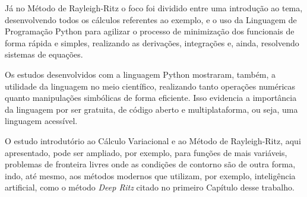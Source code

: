 \documentclass[
	12pt,				%
	openright,			%
    twoside,			%
	a4paper,			%
	english,			%
	french,				%
	spanish,			%
	brazil				%
	]{abntex2}
\numberwithin{lema}{chapter}
\numberwithin{teorema}{chapter}
\numberwithin{definicao}{chapter}
\numberwithin{exemplo}{chapter}
\numberwithin{figure}{chapter}
\begin{document}
Já no Método de Rayleigh-Ritz o foco foi dividido entre uma introdução ao tema, desenvolvendo todos os cálculos referentes ao exemplo, e o uso da Linguagem de Programação Python para agilizar o processo de minimização dos funcionais de forma rápida e simples, realizando as derivações, integrações e, ainda, resolvendo sistemas de equações.

Os estudos desenvolvidos com a linguagem Python mostraram, também, a utilidade da linguagem no meio científico, realizando tanto operações numéricas quanto manipulações simbólicas de forma eficiente. Isso evidencia a importância da linguagem por ser gratuita, de código aberto e multiplataforma, ou seja, uma linguagem acessível.

O estudo introdutório ao Cálculo Variacional e ao Método de Rayleigh-Ritz, aqui apresentado, pode ser ampliado, por exemplo, para funções de mais variáveis, problemas de fronteira livres onde as condições de contorno são de outra forma, indo, até mesmo, aos métodos modernos que utilizam, por exemplo, inteligência artificial, como o método \textit{Deep Ritz} citado no primeiro Capítulo desse trabalho.

\postextual



%
%

\end{document}
